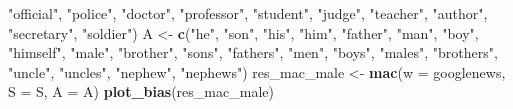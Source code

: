 \documentclass[english,man,mask]{apa6}
\newenvironment{Shaded}{\begin{snugshade}}{\end{snugshade}}
\newcommand{\DataTypeTok}[1]{\textcolor[rgb]{0.13,0.29,0.53}{#1}}
\newcommand{\KeywordTok}[1]{\textcolor[rgb]{0.13,0.29,0.53}{\textbf{#1}}}
\newcommand{\NormalTok}[1]{#1}
\newcommand{\StringTok}[1]{\textcolor[rgb]{0.31,0.60,0.02}{#1}}
\begin{document}
\begin{Shaded}
\begin{Highlighting}[]
       \StringTok{"official"}\NormalTok{, }\StringTok{"police"}\NormalTok{, }\StringTok{"doctor"}\NormalTok{, }\StringTok{"professor"}\NormalTok{, }\StringTok{"student"}\NormalTok{, }\StringTok{"judge"}\NormalTok{,}
       \StringTok{"teacher"}\NormalTok{, }\StringTok{"author"}\NormalTok{, }\StringTok{"secretary"}\NormalTok{, }\StringTok{"soldier"}\NormalTok{)}
\NormalTok{A <-}\StringTok{ }\KeywordTok{c}\NormalTok{(}\StringTok{"he"}\NormalTok{, }\StringTok{"son"}\NormalTok{, }\StringTok{"his"}\NormalTok{, }\StringTok{"him"}\NormalTok{, }\StringTok{"father"}\NormalTok{, }\StringTok{"man"}\NormalTok{, }\StringTok{"boy"}\NormalTok{, }\StringTok{"himself"}\NormalTok{, }\StringTok{"male"}\NormalTok{,}
       \StringTok{"brother"}\NormalTok{, }\StringTok{"sons"}\NormalTok{, }\StringTok{"fathers"}\NormalTok{, }\StringTok{"men"}\NormalTok{, }\StringTok{"boys"}\NormalTok{, }\StringTok{"males"}\NormalTok{, }\StringTok{"brothers"}\NormalTok{,}
       \StringTok{"uncle"}\NormalTok{, }\StringTok{"uncles"}\NormalTok{, }\StringTok{"nephew"}\NormalTok{, }\StringTok{"nephews"}\NormalTok{)}
\NormalTok{res_mac_male <-}\StringTok{ }\KeywordTok{mac}\NormalTok{(}\DataTypeTok{w =}\NormalTok{ googlenews, }\DataTypeTok{S =}\NormalTok{ S, }\DataTypeTok{A =}\NormalTok{ A)}
\KeywordTok{plot_bias}\NormalTok{(res_mac_male)}
\end{Highlighting}
\end{Shaded}
\end{document}
